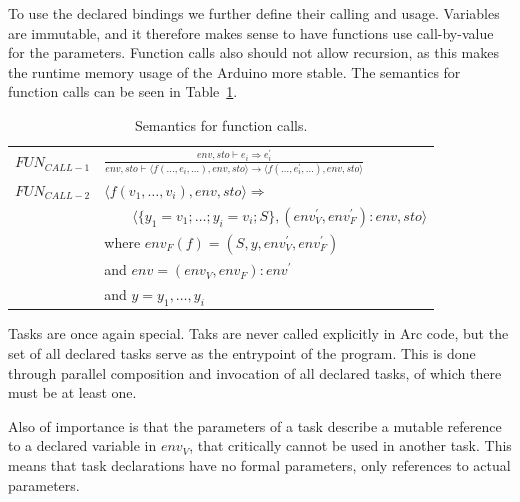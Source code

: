 To use the declared bindings we further define their calling and usage. Variables are immutable, and it therefore makes sense to have functions use call-by-value for the parameters. Function calls also should not allow recursion, as this makes the runtime memory usage of the Arduino more stable. The semantics for function calls can be seen in Table~\ref{tab:functioncalls}.


\begin{table}[htb!]
    \centering
    \begin{tabular}{ll}
        \toprule
        $FUN_{CALL-1}$ & $\frac
            {env, sto \vdash e_i \Rightarrow e^\prime_i}
            {env, sto \vdash \langle f(\dots, e_i, \dots), env,sto \rangle \rightarrow \langle f(\dots, e^\prime_i, \dots), env, sto \rangle}$ \\ [12pt]
        $FUN_{CALL-2}$ & $\langle f(v_1,\dots,v_i), env, sto \rangle \Rightarrow$                                                              \\
                       & $\qquad \langle \{y_1 = v_1;\dots;y_i = v_i; S\}, (env^\prime_V, env^\prime_F):env, sto \rangle$                      \\ [12pt]

                       & where $env_F(f) = (S, y, env^\prime_V, env^\prime_F)$                                                                 \\
                       & and $env = (env_V, env_F) : env^\prime $                                                                              \\
                       & and $y = y_1,\dots,y_i$                                                                                               \\
        \bottomrule
    \end{tabular}
    \caption{Semantics for function calls.}
    \label{tab:functioncalls}
\end{table}


Tasks are once again special. Taks are never called explicitly in Arc code, but the set of all declared tasks serve as the entrypoint of the program. This is done through parallel composition and invocation of all declared tasks, of which there must be at least one.

Also of importance is that the parameters of a task describe a mutable reference to a declared variable in $env_V$, that critically cannot be used in another task. This means that task declarations have no formal parameters, only references to actual parameters.

